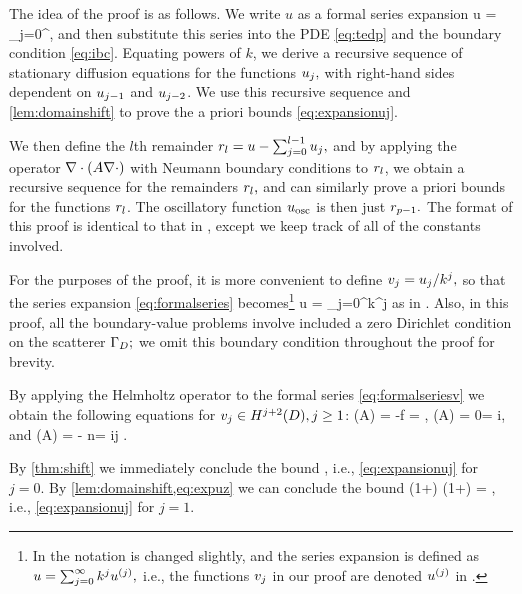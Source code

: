 The idea of the proof is as follows. We write $u$ as a formal series expansion
\beq\label{eq:formalseries}
u = \sum_{j=0}^\infty \usj,
\eeq
and then substitute this series into the PDE \cref{eq:tedp} and the boundary condition \eqref{eq:ibc}. Equating powers of $k$, we derive a recursive sequence of stationary diffusion equations for the functions $u_{j},$ with right-hand sides dependent on $u_{j-1}$ and $u_{j-2}$. We use this recursive sequence and \cref{lem:domainshift} to prove the a priori bounds \cref{eq:expansionuj}.

We then define the $l$th remainder $r_{l} = u - \sum_{j=0}^{l-1} u_{j},$ and by applying the operator $\grad\cdot\mleft(A\grad \cdot\mright)$ with Neumann boundary conditions to $r_{l}$, we obtain a recursive sequence for the remainders $r_{l},$ and can similarly prove a priori bounds for the functions $r_{l}$. The oscillatory function $u_{\mathrm{osc}}$ is then just $r_{p-1}.$ The format of this proof is identical to that in \cite[Theorem 1]{ChNi:19}, except we keep track of all of the constants involved.

For the purposes of the proof, it is more convenient to define $v_{j} = u_{j}/k^j,$ so that the series expansion \cref{eq:formalseries} becomes\footnote{In \cite{ChNi:19} the notation is changed slightly, and the series expansion is defined as $u = \sum_{j=0}^\infty k^j u^{(j)},$ i.e., the functions $v_{j}$ in our proof are denoted $u^{(j)}$ in \cite{ChNi:19}.}
\beq\label{eq:formalseriesv}
u = \sum_{j=0}^\infty k^j\vj
\eeq
as in \cite{ChNi:19}. Also, in this proof, all the boundary-value problems involve included a zero Dirichlet condition on the scatterer $\Gamma_{D};$ we omit this boundary condition throughout the proof for brevity.

By applying the Helmholtz operator to the formal series \eqref{eq:formalseriesv} we obtain the following equations for $\vj \in \HjptD, j \geq 1$:
\beqs
\grad \cdot \mleft(A\grad \vz\mright) = -f \quad\tand\quad \dn \vz = \gI,
\eeqs
\beqs
\grad \cdot \mleft(A\grad \vo\mright) = 0\quad\tand\quad\dn \vo = i\vz,
\eeqs
and
\beq\label{eq:vj}
\grad \cdot \mleft(A\grad \vj\mright) = - n\vjmt\quad\tand\quad\dn \vz = i\vjmo \quad\tfor j \in \mleft[2,p-2\mright].
\eeq

By \cref{thm:shift} we immediately conclude the bound
\beq\label{eq:expuz}
\NHtD{\vz} \leq \CAz\Cfg \leq {}\Cfg,
\eeq
i.e., \cref{eq:expansionuj} for $j=0.$ By \cref{lem:domainshift,eq:expuz} we can conclude the bound
\beqs
\NHthD{\vo} \leq \CAo \mleft(1+\CTrt\mright) \leq \max{}\mleft(1+\mright) \Cfg = \Cfg,
\eeqs
i.e., \cref{eq:expansionuj} for $j=1$.

